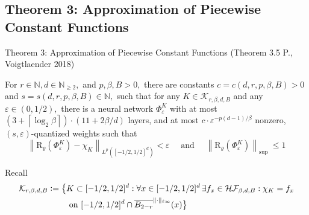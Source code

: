 \documentclass{if-beamer}
\newcommand{\defeq}{\vcentcolon=}
\begin{document}
\subsection{Theorem 3: Approximation of Piecewise Constant Functions}
\begin{frame}{Theorem 3: Approximation of Piecewise Constant Functions (Theorem 3.5 P., Voigtlaender 2018)}
    \begin{tcolorbox}
    For $r \in \mathbb{N}, d \in \mathbb{N}_{\geq 2},$ and $p, \beta, B>0,$ there are constants $c=c(d, r, p, \beta, B)>0$ and $s=s(d, r, p, \beta, B) \in \mathbb{N},$ such that for any $K \in \mathcal{K}_{r, \beta, d, B}$ and any $\varepsilon \in(0,1 / 2),$ there is a neural network $\Phi_{\varepsilon}^{K}$ with at most $\left(3+\left\lceil\log _{2} \beta\right\rceil\right) \cdot(11+2 \beta / d)$ layers, and at most $c \cdot \varepsilon^{-p(d-1) / \beta}$ nonzero, $(s, \varepsilon)$-quantized weights such that {\small
    \[
    \left\|\mathrm{R}_{\varrho}\left(\Phi_{\varepsilon}^{K}\right)-\chi_{K}\right\|_{L^{p}\left([-1 / 2,1 / 2]^{d}\right)}<\varepsilon \quad \text { and } \quad\left\|\mathrm{R}_{\varrho}\left(\Phi_{\varepsilon}^{K}\right)\right\|_{\text {sup }} \leq 1
    \]}
    \end{tcolorbox}
    Recall 
    \begin{align*}
        \mathcal{K}_{r, \beta, d, B} \defeq \big\{&K \subset[-1 / 2,1 / 2]^{d}: \forall x \in[-1 / 2,1 / 2]^{d} \, \exists f_{x} \in \mathcal{H} \mathcal{F}_{\beta, d, B}: \chi_{K}=f_{x}\\
        &\text { on }[-1 / 2,1 / 2]^{d} \cap \overline{B_{2-r}}^{\|\cdot\|_{\ell \infty}}(x)\big\}
    \end{align*}
\end{frame}
\end{document}
